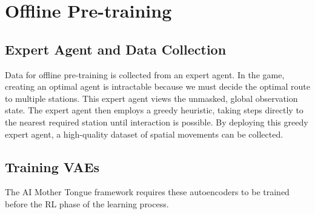 


\section{Offline Pre-training}
\label{sec:3.6}

\subsection{Expert Agent and Data Collection}
\label{sec:3.6.1}

Data for offline pre-training is collected from an expert agent.
In the game, creating an optimal agent is intractable because we must decide the optimal route to multiple stations.
This expert agent views the unmasked, global observation state.
The expert agent then employs a greedy heuristic, taking steps directly to the nearest required station until interaction is possible.
By deploying this greedy expert agent, a high-quality dataset of spatial movements can be collected.

\subsection{Training VAEs}
\label{sec:3.6.2}

The AI Mother Tongue framework requires these autoencoders to be trained before the RL phase of the learning process.

